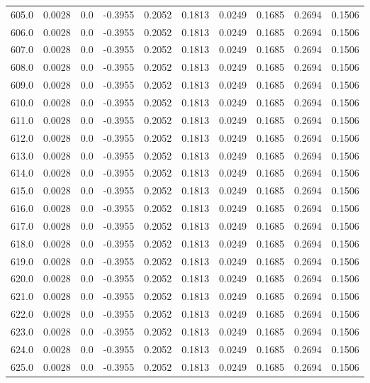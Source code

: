 \begin{longtable}{lrrrrrrrrr}
605.0 & 0.0028 & 0.0 & -0.3955 & 0.2052 & 0.1813 & 0.0249 & 0.1685 & 0.2694 & 0.1506 \\
606.0 & 0.0028 & 0.0 & -0.3955 & 0.2052 & 0.1813 & 0.0249 & 0.1685 & 0.2694 & 0.1506 \\
607.0 & 0.0028 & 0.0 & -0.3955 & 0.2052 & 0.1813 & 0.0249 & 0.1685 & 0.2694 & 0.1506 \\
608.0 & 0.0028 & 0.0 & -0.3955 & 0.2052 & 0.1813 & 0.0249 & 0.1685 & 0.2694 & 0.1506 \\
609.0 & 0.0028 & 0.0 & -0.3955 & 0.2052 & 0.1813 & 0.0249 & 0.1685 & 0.2694 & 0.1506 \\
610.0 & 0.0028 & 0.0 & -0.3955 & 0.2052 & 0.1813 & 0.0249 & 0.1685 & 0.2694 & 0.1506 \\
611.0 & 0.0028 & 0.0 & -0.3955 & 0.2052 & 0.1813 & 0.0249 & 0.1685 & 0.2694 & 0.1506 \\
612.0 & 0.0028 & 0.0 & -0.3955 & 0.2052 & 0.1813 & 0.0249 & 0.1685 & 0.2694 & 0.1506 \\
613.0 & 0.0028 & 0.0 & -0.3955 & 0.2052 & 0.1813 & 0.0249 & 0.1685 & 0.2694 & 0.1506 \\
614.0 & 0.0028 & 0.0 & -0.3955 & 0.2052 & 0.1813 & 0.0249 & 0.1685 & 0.2694 & 0.1506 \\
615.0 & 0.0028 & 0.0 & -0.3955 & 0.2052 & 0.1813 & 0.0249 & 0.1685 & 0.2694 & 0.1506 \\
616.0 & 0.0028 & 0.0 & -0.3955 & 0.2052 & 0.1813 & 0.0249 & 0.1685 & 0.2694 & 0.1506 \\
617.0 & 0.0028 & 0.0 & -0.3955 & 0.2052 & 0.1813 & 0.0249 & 0.1685 & 0.2694 & 0.1506 \\
618.0 & 0.0028 & 0.0 & -0.3955 & 0.2052 & 0.1813 & 0.0249 & 0.1685 & 0.2694 & 0.1506 \\
619.0 & 0.0028 & 0.0 & -0.3955 & 0.2052 & 0.1813 & 0.0249 & 0.1685 & 0.2694 & 0.1506 \\
620.0 & 0.0028 & 0.0 & -0.3955 & 0.2052 & 0.1813 & 0.0249 & 0.1685 & 0.2694 & 0.1506 \\
621.0 & 0.0028 & 0.0 & -0.3955 & 0.2052 & 0.1813 & 0.0249 & 0.1685 & 0.2694 & 0.1506 \\
622.0 & 0.0028 & 0.0 & -0.3955 & 0.2052 & 0.1813 & 0.0249 & 0.1685 & 0.2694 & 0.1506 \\
623.0 & 0.0028 & 0.0 & -0.3955 & 0.2052 & 0.1813 & 0.0249 & 0.1685 & 0.2694 & 0.1506 \\
624.0 & 0.0028 & 0.0 & -0.3955 & 0.2052 & 0.1813 & 0.0249 & 0.1685 & 0.2694 & 0.1506 \\
625.0 & 0.0028 & 0.0 & -0.3955 & 0.2052 & 0.1813 & 0.0249 & 0.1685 & 0.2694 & 0.1506 \\

\end{longtable}

